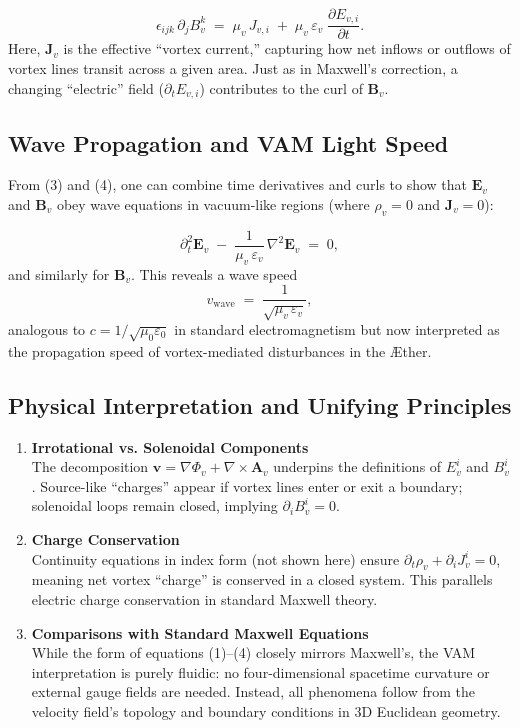 \[
    \epsilon_{ijk}\,\partial_j B_{v}^k
    \;=\;
    \mu_v\,J_{v,i}
    \;+\;
    \mu_v\,\varepsilon_v\;\frac{\partial E_{v,i}}{\partial t}.
    \tag{4}
\]
Here, \(\mathbf{J}_v\) is the effective “vortex current,” capturing how net inflows or outflows of vortex lines transit across a given area. Just as in Maxwell’s correction, a changing “electric” field (\(\partial_t E_{v,i}\)) contributes to the curl of \(\mathbf{B}_v\).

\subsection{Wave Propagation and VAM Light Speed}

From (3) and (4), one can combine time derivatives and curls to show that \(\mathbf{E}_v\) and \(\mathbf{B}_v\) obey wave equations in vacuum-like regions (where \(\rho_v=0\) and \(\mathbf{J}_v=0\)):

\[
    \partial_t^2 \mathbf{E}_v
    \;-\;
    \frac{1}{\mu_v\,\varepsilon_v}\,
    \nabla^2 \mathbf{E}_v
    \;=\; 0,
\]
and similarly for \(\mathbf{B}_v\). This reveals a wave speed
\[
    v_{\mathrm{wave}}
    \;=\;
    \frac{1}{\sqrt{\mu_v\,\varepsilon_v}},
\]
analogous to \(c = 1/\sqrt{\mu_0\varepsilon_0}\) in standard electromagnetism but now interpreted as the propagation speed of vortex-mediated disturbances in the Æther.

\subsection{Physical Interpretation and Unifying Principles}

\begin{enumerate}
    \item \textbf{Irrotational vs. Solenoidal Components} \\
    The decomposition \(\mathbf{v} = \nabla \Phi_v + \nabla\times \mathbf{A}_v\) underpins the definitions of \(E_{v}^i\) and \(B_{v}^i\). Source-like “charges” appear if vortex lines enter or exit a boundary; solenoidal loops remain closed, implying \(\partial_i B_{v}^i=0\).
    \item \textbf{Charge Conservation} \\
    Continuity equations in index form (not shown here) ensure \(\partial_t \rho_v + \partial_i J_{v}^i = 0\), meaning net vortex “charge” is conserved in a closed system. This parallels electric charge conservation in standard Maxwell theory.
    \item \textbf{Comparisons with Standard Maxwell Equations} \\
    While the form of equations (1)--(4) closely mirrors Maxwell’s, the VAM interpretation is purely fluidic: no four-dimensional spacetime curvature or external gauge fields are needed. Instead, all phenomena follow from the velocity field’s topology and boundary conditions in 3D Euclidean geometry.
\end{enumerate}


